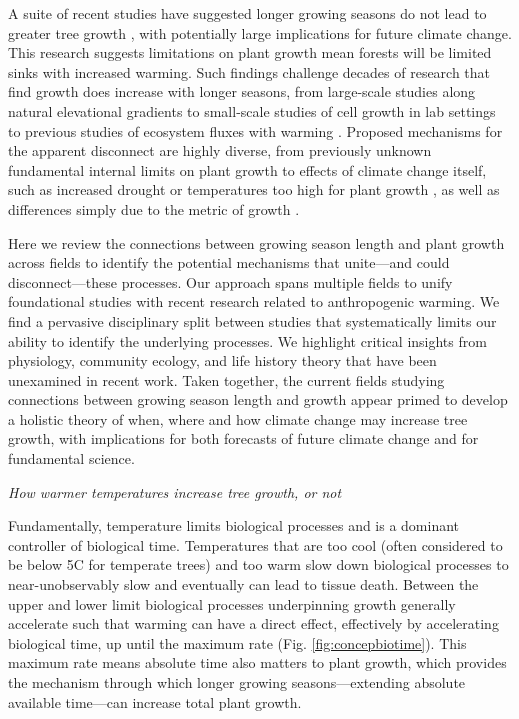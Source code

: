 \documentclass[11pt]{article}
\begin{document}
A suite of recent studies have suggested longer growing seasons do not lead to greater tree growth \citep{dow2022warm,green2022limits,silvestro2023longer}, with potentially large implications for future climate change. This research suggests limitations on plant growth mean forests will be limited sinks with increased warming. Such findings challenge decades of research that find growth does increase with longer seasons, from large-scale studies along natural elevational gradients to small-scale studies of cell growth in lab settings to previous studies of ecosystem fluxes with warming \citep{finzi2020,keenan2014net}. Proposed mechanisms for the apparent disconnect are highly diverse, from previously unknown fundamental internal limits on plant growth \citep{zohner2023effect} to effects of climate change itself, such as increased drought or temperatures too high for plant growth \citep{dow2022warm}, as well as differences simply due to the metric of growth \citep{green2022limits}.

Here we review the connections between growing season length and plant growth across fields to identify the potential mechanisms that unite---and could disconnect---these processes. Our approach spans multiple fields to unify foundational studies with recent research related to anthropogenic warming. We find a pervasive disciplinary split between studies that systematically limits our ability to identify the underlying processes. We highlight critical insights from physiology, community ecology, and life history theory that have been unexamined in recent work. Taken together, the current fields studying connections between growing season length and growth appear primed to develop a holistic theory of when, where and how climate change may increase tree growth, with implications for both forecasts of future climate change and for fundamental science.

\emph{How warmer temperatures increase tree growth, or not}

Fundamentally, temperature limits biological processes and is a dominant controller of biological time. Temperatures that are too cool (often considered to be below 5\degree C for temperate trees) and too warm \citep[an area of active research][, see also Fig. \ref{fig:temperaturecomplex}]{martinez2008hot,cabon2022cross} slow down biological processes to near-unobservably slow and eventually can lead to tissue death. Between the upper and lower limit biological processes underpinning growth generally accelerate such that warming can have a direct effect, effectively by accelerating biological time, up until the maximum rate (Fig. \ref{fig:concepbiotime}). This maximum rate means absolute time also matters to plant growth, which provides the mechanism through which longer growing seasons---extending absolute available time---can increase total plant growth. %
 
\end{document}

